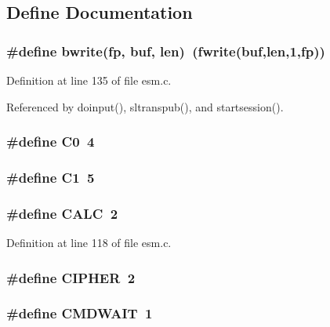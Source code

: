 \subsection{Define Documentation}
\subsubsection{\setlength{\rightskip}{0pt plus 5cm}\#define bwrite(fp, {\bf buf}, {\bf len})\ (fwrite({\bf buf},{\bf len},1,fp))}\label{esm_8c_a10}




Definition at line 135 of file esm.c.

Referenced by doinput(), sltranspub(), and startsession().
\subsubsection{\setlength{\rightskip}{0pt plus 5cm}\#define C0\ 4}\label{esm_8c_a19}


\subsubsection{\setlength{\rightskip}{0pt plus 5cm}\#define C1\ 5}\label{esm_8c_a20}


\subsubsection{\setlength{\rightskip}{0pt plus 5cm}\#define CALC\ 2}\label{esm_8c_a2}




Definition at line 118 of file esm.c.
\subsubsection{\setlength{\rightskip}{0pt plus 5cm}\#define CIPHER\ 2}\label{esm_8c_a13}


\subsubsection{\setlength{\rightskip}{0pt plus 5cm}\#define CMDWAIT\ 1}\label{esm_8c_a12}


